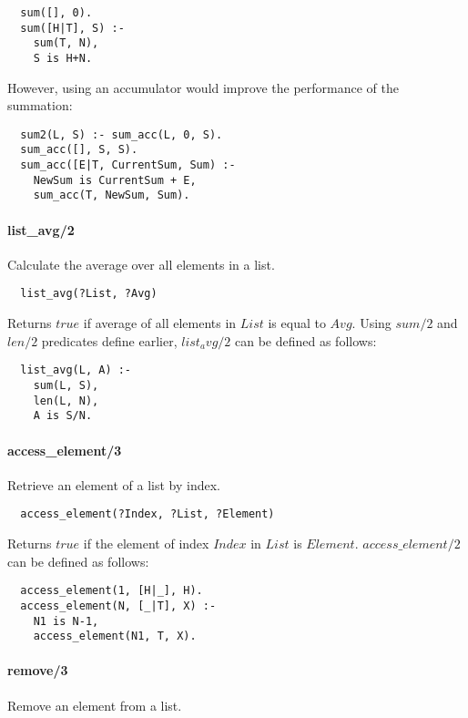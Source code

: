 \documentclass{article}
\begin{document}
\begin{multicols}{2}
  \begin{lstlisting}
  sum([], 0).
  sum([H|T], S) :-
    sum(T, N),
    S is H+N.
  \end{lstlisting} 
  
  However, using an accumulator would improve the performance of the summation:
  
  \begin{lstlisting}
  sum2(L, S) :- sum_acc(L, 0, S).
  sum_acc([], S, S).
  sum_acc([E|T, CurrentSum, Sum) :-
    NewSum is CurrentSum + E,
    sum_acc(T, NewSum, Sum).
  \end{lstlisting} 
  
  \paragraph{list\_avg/2} Calculate the average over all elements in a list.
  
  \begin{lstlisting}
  list_avg(?List, ?Avg)
  \end{lstlisting} 
  
  Returns $true$ if average of all elements in $List$ is equal to $Avg$. Using $sum/2$ and $len/2$ predicates define earlier, $list_avg/2$ can be defined as follows:

  \begin{lstlisting}
  list_avg(L, A) :-
    sum(L, S),
    len(L, N),
    A is S/N.
  \end{lstlisting}
 
  \paragraph{access\_element/3} Retrieve an element of a list by index.
  
  \begin{lstlisting}
  access_element(?Index, ?List, ?Element)
  \end{lstlisting}
  
  Returns $true$ if the element of index $Index$ in $List$ is $Element$. $access\_element/2$ can be defined as follows:

  \begin{lstlisting}
  access_element(1, [H|_], H).
  access_element(N, [_|T], X) :-
    N1 is N-1,
    access_element(N1, T, X).
  \end{lstlisting}
  
  \paragraph{remove/3} Remove an element from a list.
  

\end{multicols}
\end{document}
